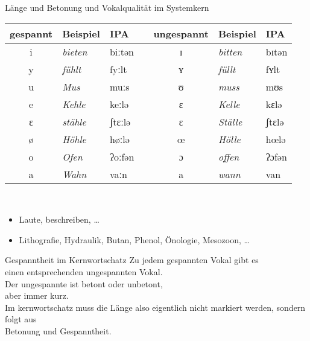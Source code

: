 \begin{frame}
  {Länge und Betonung und Vokalqualität im Systemkern}
  \pause
  \centering
  \begin{tabular}{cllp{0.25cm}cll}
    \toprule
    \textbf{gespannt} & \textbf{Beispiel} & \textbf{IPA} & & \textbf{ungespannt} & \textbf{Beispiel} & \textbf{IPA} \\
    \midrule
    i  & \textit{bieten} & biːtən && ɪ & \textit{bitten}  & bɪtən   \\
    y  & \textit{fühlt}  & fyːlt  && ʏ & \textit{füllt}   & fʏlt    \\
    u  & \textit{Mus}    & muːs   && ʊ & \textit{muss}    & mʊs     \\
    e  & \textit{Kehle}  & keːlə  && ɛ & \textit{Kelle}   & kɛlə    \\
    ɛ  & \textit{stähle} & ʃtɛːlə && ɛ & \textit{Ställe}  & ʃtɛlə   \\
    ø  & \textit{Höhle}  & høːlə  && œ & \textit{Hölle}   & hœlə \\
    o  & \textit{Ofen}   & ʔoːfən && ɔ & \textit{offen}   & ʔɔfən   \\
    a  & \textit{Wahn}   & vaːn   && a & \textit{wann}    & van     \\
    \bottomrule
  \end{tabular}\\
  \pause
  \Zeile
  \begin{itemize}[<+->]
    \item Laut\alert{e}, b\alert{e}schreib\alert{e}n, \dots
    \item L\alert{i}thografie, H\alert{y}draulik, B\alert{u}tan, Ph\alert{e}nol, \alert{Ö}nologie, Mes\alert{o}zoon, \dots
  \end{itemize}
\end{frame}

\begin{frame}
  {Gespanntheit im Kernwortschatz}
  \pause
  \Large
   Zu jedem gespannten Vokal gibt es\\
  einen entsprechenden ungespannten Vokal.\\
  Der ungespannte ist betont oder unbetont,\\
  aber immer kurz.\\
  \Zeile
  Im kernwortschatz muss die Länge also eigentlich nicht markiert werden, sondern folgt aus\\
  Betonung und Gespanntheit.
\end{frame}

